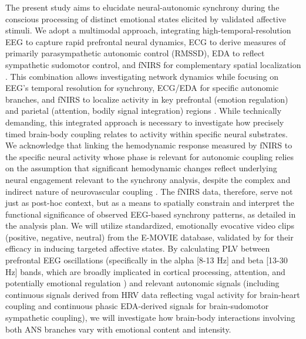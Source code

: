 \documentclass[12pt]{article} %
\begin{document}
The present study aims to elucidate neural-autonomic synchrony during the conscious processing of distinct emotional states elicited by validated affective stimuli. We adopt a multimodal approach, integrating high-temporal-resolution \gls{EEG} to capture rapid prefrontal neural dynamics, \gls{ECG} to derive measures of primarily parasympathetic autonomic control (\gls{RMSSD}), \gls{EDA} to reflect sympathetic sudomotor control, and \gls{fNIRS} for complementary spatial localization \parencite{scholkmannReviewContinuousWave2014, pintiCurrentStatusIssues2019}. This combination allows investigating network dynamics while focusing on \gls{EEG}'s temporal resolution for synchrony, \gls{ECG}/\gls{EDA} for specific autonomic branches, and \gls{fNIRS} to localize activity in key prefrontal (emotion regulation) and parietal (attention, bodily signal integration) regions \parencite{pessoaRelationshipEmotionCognition2008, critchleyNeuralMechanismsAutonomic2005}. While technically demanding, this integrated approach is necessary to investigate how precisely timed brain-body coupling relates to activity within specific neural substrates. We acknowledge that linking the hemodynamic response measured by \gls{fNIRS} to the specific neural activity whose phase is relevant for autonomic coupling relies on the assumption that significant hemodynamic changes reflect underlying neural engagement relevant to the synchrony analysis, despite the complex and indirect nature of neurovascular coupling \parencite{logothetisInterpretingBOLDSignal2004}. The \gls{fNIRS} data, therefore, serve not just as post-hoc context, but as a means to spatially constrain and interpret the functional significance of observed \gls{EEG}-based synchrony patterns, as detailed in the analysis plan. We will utilize standardized, emotionally evocative video clips (positive, negative, neutral) from the E-MOVIE database, validated by \textcite{maffeiEMOVIEExperimentalMOVies2019} for their efficacy in inducing targeted affective states. By calculating \gls{PLV} between prefrontal \gls{EEG} oscillations (specifically in the alpha [8-13 Hz] and beta [13-30 Hz] bands, which are broadly implicated in cortical processing, attention, and potentially emotional regulation \parencite{klimeschEEGAlphaTheta1999, koenigMillisecondMillisecondYear2002, allenIssuesAssumptionsRoad2004}) and relevant autonomic signals (including continuous signals derived from \gls{HRV} data reflecting vagal activity for brain-heart coupling and continuous phasic \gls{EDA}-derived signals for brain-sudomotor sympathetic coupling), we will investigate how brain-body interactions involving both \gls{ANS} branches vary with emotional content and intensity.\\
\end{document}
